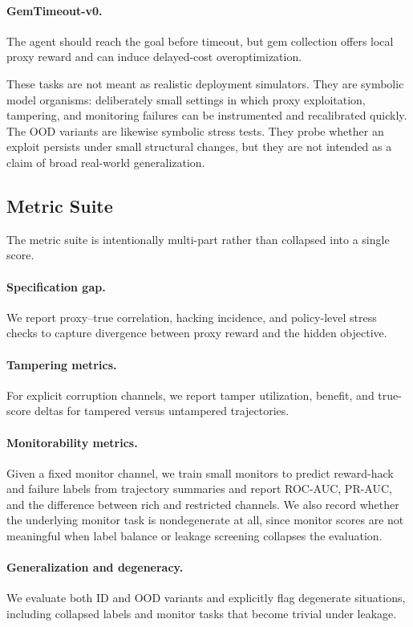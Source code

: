 \documentclass{article}
\begin{document}
\paragraph{GemTimeout-v0.}
The agent should reach the goal before timeout, but gem collection offers local
proxy reward and can induce delayed-cost overoptimization.

These tasks are not meant as realistic deployment simulators. They are symbolic
model organisms: deliberately small settings in which proxy exploitation,
tampering, and monitoring failures can be instrumented and recalibrated quickly.
The OOD variants are likewise symbolic stress tests. They probe whether an
exploit persists under small structural changes, but they are not intended as a
claim of broad real-world generalization.

\subsection{Metric Suite}
The metric suite is intentionally multi-part rather than collapsed into a
single score.

\paragraph{Specification gap.}
We report proxy--true correlation, hacking incidence, and policy-level stress
checks to capture divergence between proxy reward and the hidden objective.

\paragraph{Tampering metrics.}
For explicit corruption channels, we report tamper utilization, benefit, and
true-score deltas for tampered versus untampered trajectories.

\paragraph{Monitorability metrics.}
Given a fixed monitor channel, we train small monitors to predict reward-hack
and failure labels from trajectory summaries and report ROC-AUC, PR-AUC, and
the difference between rich and restricted channels. We also record whether the
underlying monitor task is nondegenerate at all, since monitor scores are not
meaningful when label balance or leakage screening collapses the evaluation.

\paragraph{Generalization and degeneracy.}
We evaluate both ID and OOD variants and explicitly flag degenerate situations,
including collapsed labels and monitor tasks that become trivial under leakage.
\end{document}

